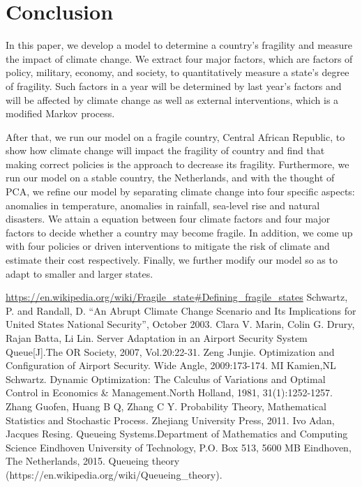 \documentclass{mcmthesis}
\begin{document}
	\section{Conclusion}
		In this paper, we develop a model to determine a country's fragility and measure the impact of climate change. We extract four major factors, which are factors of policy, military, economy, and society, to quantitatively measure a state's degree of fragility. Such factors in a year will be determined by last year's factors and will be affected by climate change as well as external interventions, which is a modified Markov process. 
		
		After that, we run our model on a fragile country, Central African Republic, to show how climate change will impact the fragility of country and find that making correct policies is the approach to decrease its fragility. Furthermore, we run our model on a stable country, the Netherlands, and with the thought of PCA, we refine our model by separating climate change into four specific aspects:  anomalies in temperature, anomalies in rainfall, sea-level rise and natural disasters. We attain a equation between four climate factors and four major factors to decide whether a country may become fragile. In addition, we come up with four policies or driven interventions to mitigate the risk of climate and estimate their cost respectively. Finally, we further modify our model so as to adapt to smaller and larger states.
	
	\begin{thebibliography}{99}
		\url{https://en.wikipedia.org/wiki/Fragile_state#Defining_fragile_states}
		Schwartz, P. and Randall, D. “An Abrupt Climate Change Scenario and Its Implications for United States National Security”, October 2003.
		Clara V. Marin, Colin G. Drury, Rajan Batta, Li Lin. Server Adaptation in an Airport Security System Queue[J].The OR Society, 2007, Vol.20:22-31.
		Zeng Junjie. Optimization and Configuration of Airport Security. Wide Angle, 2009:173-174.
		MI Kamien,NL Schwartz. Dynamic Optimization: The Calculus of Variations and Optimal Control in Economics \& Management.North Holland, 1981, 31(1):1252-1257.
		Zhang Guofen, Huang B Q, Zhang C Y. Probability Theory, Mathematical Statistics and Stochastic Process. Zhejiang University Press, 2011.
		Ivo Adan, Jacques Resing. Queueing Systems.Department of Mathematics and Computing Science Eindhoven University of Technology, P.O. Box 513, 5600 MB Eindhoven, The Netherlands, 2015.
		Queueing theory (https://en.wikipedia.org/wiki/Queueing\_theory).
	\end{thebibliography}
	
\end{document}
